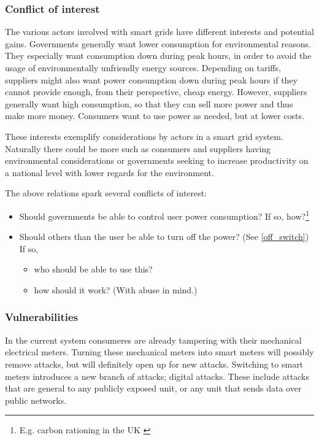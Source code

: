 \subsubsection{Conflict of interest}
The various actors involved with smart grids have different interests and potential gains.
Governments generally want lower consumption for environmental reasons.
They especially want consumption down during peak hours, in order to avoid the usage of environmentally unfriendly energy sources.
Depending on tariffs, suppliers might also want power consumption down during peak hours if they cannot provide enough, from their perspective, cheap energy.
However, suppliers generally want high consumption, so that they can sell more power and thus make more money.
Consumers want to use power as needed, but at lower costs.

These interests exemplify considerations by actors in a smart grid system.
Naturally there could be more such as consumers and suppliers having environmental considerations or governments seeking to increase productivity on a national level with lower regards for the environment.

The above relations spark several conflicts of interest:
\begin{itemize}
	\item Should governments be able to control user power consumption? If so, how?\footnote{E.g. carbon rationing in the UK \cite{security_economics}}
	\item Should others than the user be able to turn off the power? (See \cref{off_switch}) If so,
	\begin{itemize}
		\item who should be able to use this?
		\item how should it work? (With abuse in mind.)
	\end{itemize}	
\end{itemize}

\subsubsection{Vulnerabilities}
In the current system consumeres are already tampering  with their mechanical electrical meters.
Turning these mechanical meters into smart meters will possibly remove attacks, but will definitely open up for new attacks.
Switching to smart meters introduces a new branch of attacks; digital attacks.
These include attacks that are general to any publicly exposed unit, or any unit that sends data over public networks.
